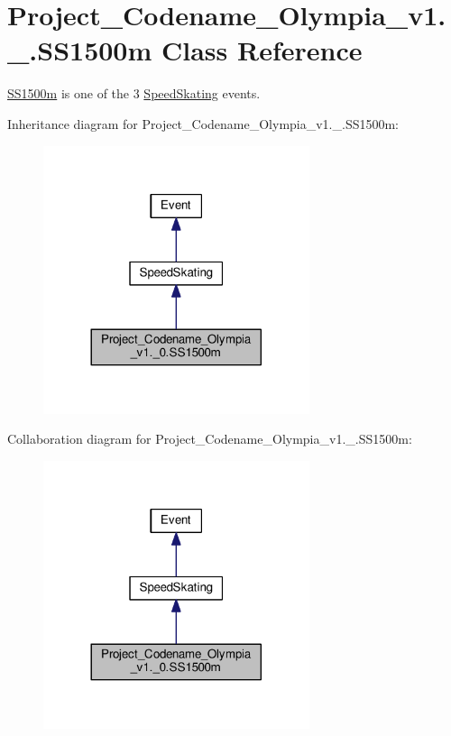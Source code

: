 \hypertarget{classProject__Codename__Olympia__v1_1_1__0_1_1SS1500m}{}\section{Project\+\_\+\+Codename\+\_\+\+Olympia\+\_\+v1.\+\_.\+S\+S1500m Class Reference}
\label{classProject__Codename__Olympia__v1_1_1__0_1_1SS1500m}


\hyperlink{classProject__Codename__Olympia__v1_1_1__0_1_1SS1500m}{S\+S1500m} is one of the 3 \hyperlink{classProject__Codename__Olympia__v1_1_1__0_1_1SpeedSkating}{Speed\+Skating} events.  




Inheritance diagram for Project\+\_\+\+Codename\+\_\+\+Olympia\+\_\+v1.\+\_.\+S\+S1500m\+:
\nopagebreak
\begin{figure}[H]
\begin{center}
\leavevmode
\includegraphics[width=221pt]{classProject__Codename__Olympia__v1_1_1__0_1_1SS1500m__inherit__graph}
\end{center}
\end{figure}


Collaboration diagram for Project\+\_\+\+Codename\+\_\+\+Olympia\+\_\+v1.\+\_.\+S\+S1500m\+:
\nopagebreak
\begin{figure}[H]
\begin{center}
\leavevmode
\includegraphics[width=221pt]{classProject__Codename__Olympia__v1_1_1__0_1_1SS1500m__coll__graph}
\end{center}
\end{figure}
